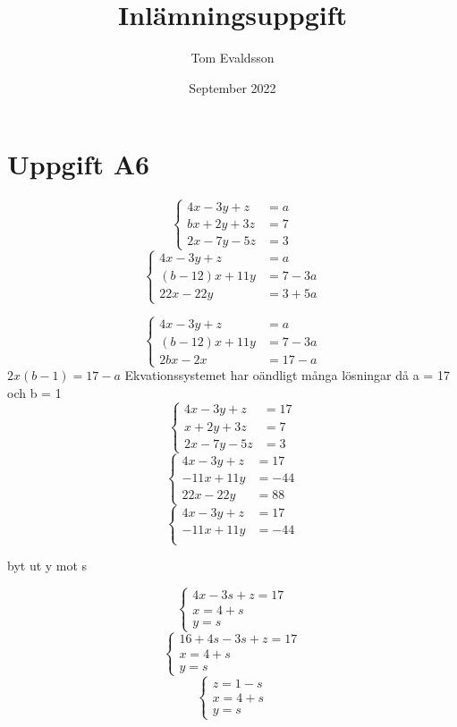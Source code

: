 \documentclass{article}
\title{Inlämningsuppgift}
\author{Tom Evaldsson}
\date{September 2022}
\begin{document}
\maketitle

\section{Uppgift A6}
$$ \left\{
\begin{array}{lr}
4x - 3y + z &= a\\
bx + 2y + 3z &= 7\\
2x - 7y - 5z &= 3
\end{array}
\right.
$$
$$
\left\{
\begin{array}{lr}
4x - 3y + z &= a\\
(b-12)x+11y &= 7-3a\\
22x - 22y &= 3+5a
\end{array}
\right. $$

$$
\left\{
\begin{array}{lr}
4x - 3y + z &= a\\
(b-12)x+11y &= 7-3a\\
2bx - 2x&= 17-a
\end{array}
\right. $$
$2x(b - 1) = 17-a$ \newline
Ekvationssystemet har oändligt många lösningar då a = 17 och b = 1
$$ \left\{
\begin{array}{lr}
4x - 3y + z &= 17\\
x + 2y + 3z &= 7\\
2x - 7y - 5z &= 3
\end{array}
\right.
$$
$$ \left\{
\begin{array}{lr}
4x - 3y + z &= 17\\
-11x+11y &= -44\\
22x-22y &= 88
\end{array}
\right.
$$
$$ \left\{
\begin{array}{lr}
4x - 3y + z &= 17\\
-11x+11y &= -44\\
\end{array}
\right.
$$

byt ut y mot s

$$ \left\{
\begin{array}{lr}
4x - 3s + z = 17\\
x = 4 + s\\
y = s
\end{array}
\right.
$$
$$ \left\{
\begin{array}{lr}
16+4s - 3s + z = 17\\
x = 4 + s\\
y = s
\end{array}
\right.
$$
$$ \left\{
\begin{array}{lr}
z = 1-s\\
x = 4 + s\\
y = s
\end{array}
\right.
$$
\end{document}
